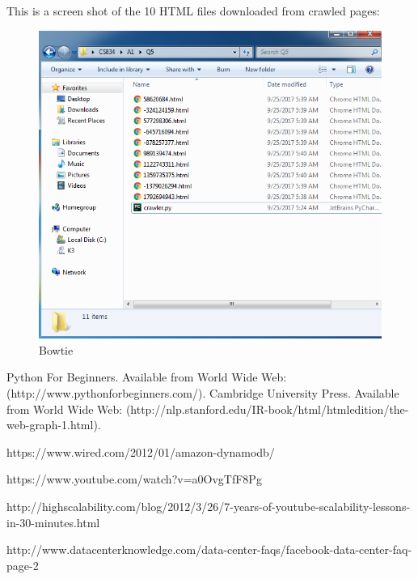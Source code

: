 \documentclass[a4paper, 11pt]{article}
\begin{document}
\pagebreak

This is a screen shot of the 10 HTML files downloaded from crawled pages:

\begin{figure}[h]
\caption{Bowtie}
\centering
\includegraphics[scale=0.7]{Q5/files.png}
\end{figure}

\begin{thebibliography}{9}
 Python For Beginners. Available from World Wide Web:(http://www.pythonforbeginners.com/).
 Cambridge University Press. Available from World Wide Web: (http://nlp.stanford.edu/IR-book/html/htmledition/the-web-graph-1.html).


https://www.wired.com/2012/01/amazon-dynamodb/

https://www.youtube.com/watch?v=a0OvgTfF8Pg

http://highscalability.com/blog/2012/3/26/7-years-of-youtube-scalability-lessons-in-30-minutes.html

http://www.datacenterknowledge.com/data-center-faqs/facebook-data-center-faq-page-2

\end{thebibliography}
\end{document}
